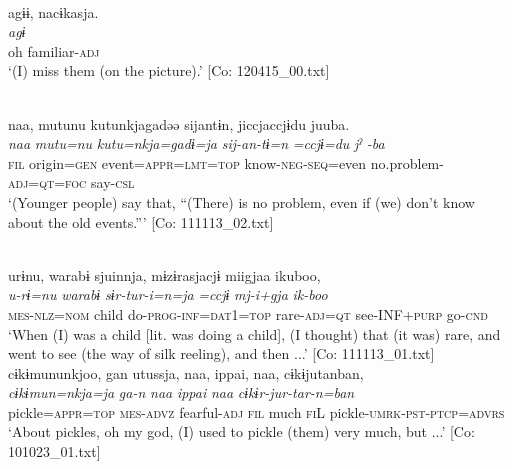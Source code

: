  \ex\relax [= (4-50 a)]\\
    \glll  agɨɨ,  nacɨkasja.\\
      \textit{agɨ}  \textit{}\\
      oh  familiar-\textsc{adj}\\
      \glt       ‘(I) miss them (on the picture).’ [Co: 120415\_00.txt]

 \ex\relax  [= (8-104 a)]\\
    \glll  naa,  mutunu  kutunkjagadəə  sijantɨn,  jiccjaccjɨdu  juuba.\\
      \textit{naa}  \textit{mutu=nu}  \textit{kutu=nkja=gadɨ=ja}  \textit{sij-an-tɨ=n}     \textit{=ccjɨ=du}  {\textit{jˀ} \textit{-ba}}\\
      \textsc{fil}  origin=\textsc{gen}  event=\textsc{appr}=\textsc{lmt}=\textsc{top}  know-\textsc{neg}-\textsc{seq}=even  no.problem-\textsc{adj}=\textsc{qt}=\textsc{foc}  say-\textsc{csl}\\
      \glt       ‘(Younger people) say that, “(There) is no problem, even if (we) don’t know about the old events.”’ [Co: 111113\_02.txt]

\ex{}\\
    \glll  urɨnu,  warabɨ  sjuinnja,  mɨzɨrasjacjɨ  miigjaa  ikuboo,\\
      \textit{u-rɨ=nu}  \textit{warabɨ}  \textit{sɨr-tur-i=n=ja}  \textit{=ccjɨ}     \textit{mj-i+gja}  \textit{ik-boo}\\
      \textsc{mes}-\textsc{nlz}=\textsc{nom}  child  do-\textsc{prog}-\textsc{inf}=\textsc{dat}1=\textsc{top}  rare-\textsc{adj}=\textsc{qt}   see-INF+\textsc{purp}  go-\textsc{cnd}      \\
      \glt       ‘When (I) was a child [lit. was doing a child], (I thought) that (it was) rare, and went to see (the way of silk reeling), and then ...’ [Co: 111113\_01.txt]
\ex %
\glll      cɨkɨmununkjoo,  gan  utussja,  naa,  ippai,  naa,  cɨkɨjutanban,\\
      \textit{cɨkɨmun=nkja=ja}  \textit{ga-n}  \textit{}  \textit{naa}  \textit{ippai}  \textit{naa}  \textit{cɨkɨr-jur-tar-n=ban}\\
      pickle=\textsc{appr}=\textsc{top}  \textsc{mes}-\textsc{advz}  fearful-\textsc{adj}  \textsc{fil}  much  \textsc{fi}L    pickle-\textsc{umrk}-\textsc{pst}-\textsc{ptcp}=\textsc{advrs}\\
      \glt       ‘About pickles, oh my god, (I) used to pickle (them) very much, but ...’ [Co: 101023\_01.txt]

